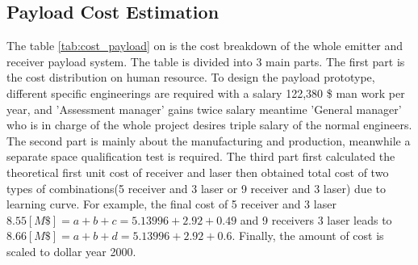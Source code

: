 \subsection{Payload Cost Estimation}
\label{cost}
The table \ref{tab:cost_payload} on \pageref{tab:cost_payload} is the cost breakdown of the whole emitter and receiver payload system. The table is divided into 3 main parts. The first part is the cost distribution on human resource. To design the payload prototype, different specific engineerings are required with a salary 122,380 \$ man work per year\cite{engineering_salary}, and 'Assessment manager' gains twice salary meantime 'General manager' who is in charge of the whole project desires triple salary of the normal engineers. The second part is mainly about the manufacturing and production, meanwhile a separate space qualification test is required. The third part first calculated the theoretical first unit cost of receiver and \acs{laser} then obtained total cost of two types of combinations(5 receiver and 3 \acs{laser} or 9 receiver and 3 \acs{laser}) due to learning curve\cite{Space2B}. For example, the final cost of 5 receiver and 3 \acs{laser} $8.55 [M\$] = a + b + c = 5.13996 + 2.92 + 0.49$ and 9 receivers 3 \acs{laser} leads to $8.66 [M\$] = a + b + d = 5.13996 + 2.92 + 0.6$. Finally, the amount of cost is scaled to dollar year 2000.

